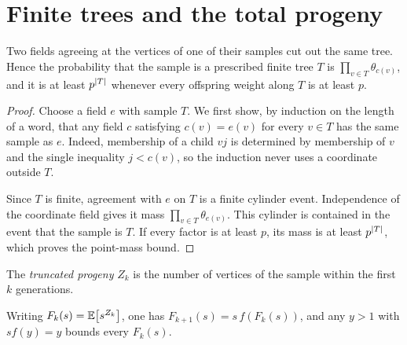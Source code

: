 \chapter{Finite trees and the total progeny}
\label{ch:progeny}

\begin{lemma}
\label{lem:point-mass}
\leanok
Two fields agreeing at the vertices of one of their samples cut out the same tree. Hence the
probability that the sample is a prescribed finite tree $T$ is
$\prod_{v\in T}\theta_{c(v)}$, and it is at least $p^{\lvert T \rvert}$ whenever every offspring
weight along $T$ is at least $p$.
\end{lemma}

\begin{proof}
\leanok
Choose a field $e$ with sample $T$. We first show, by induction on the length of a word,
that any field $c$ satisfying $c(v)=e(v)$ for every $v\in T$ has the same sample as $e$.
Indeed, membership of a child $vj$ is determined by membership of $v$ and the single
inequality $j<c(v)$, so the induction never uses a coordinate outside $T$.

Since $T$ is finite, agreement with $e$ on $T$ is a finite cylinder event. Independence
of the coordinate field gives it mass
$\prod_{v\in T}\theta_{e(v)}$. This cylinder is contained in the event that the sample is
$T$. If every factor is at least $p$, its mass is at least $p^{\lvert T \rvert}$, which proves the
point-mass bound.
\end{proof}

\begin{definition}
\label{def:progeny}
\leanok
The \emph{truncated progeny} $Z_k$ is the number of vertices of the sample within the first
$k$ generations.
\end{definition}

\begin{lemma}
\label{lem:progeny-recursion}
\leanok
Writing $F_k(s)=\mathbb{E}\bigl[s^{Z_k}\bigr]$, one has $F_{k+1}(s)=s\,f(F_k(s))$, and any
$y>1$ with $s f(y)=y$ bounds every $F_k(s)$.
\end{lemma}

